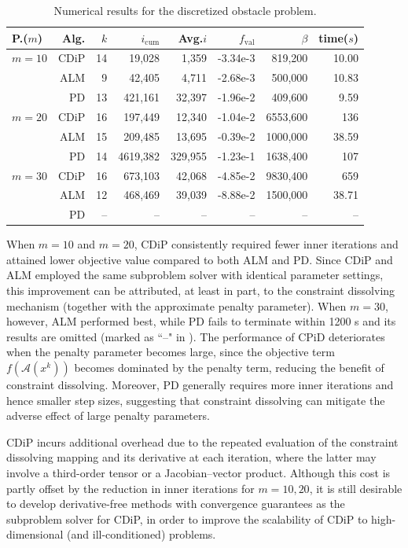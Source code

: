 \documentclass[11pt,a4paper,reqno]{amsart}
\begin{document}
{\begin{table}[htbp]
\centering
\renewcommand{\arraystretch}{1.2}
\begin{tabular}{l@{\hskip 10pt}rrrrrrr}
\hline
P.($m$) & Alg. & $k$ & $i_{\text{cum}}$ & Avg.$i$ & $f_{\text{val}}$ & $\beta$ & time($s$) \\
\hline
$m=10$ & CDiP & 14 & 19,028 & 1,359 & -3.34e-3 & 819,200 & 10.00 \\
 & ALM & 9 & 42,405 & 4,711 & -2.68e-3 & 500,000 & 10.83 \\
 & PD  & 13 & 421,161 & 32,397 & -1.96e-2 & 409,600 & 9.59 \\[4pt]
$m=20$ & CDiP & 16 & 197,449 & 12,340 & -1.04e-2 & 6553,600 & 136 \\
& ALM & 15 & 209,485 & 13,695 & -0.39e-2 & 1000,000 & 38.59\\
& PD & 14 & 4619,382 & 329,955 & -1.23e-1 & 1638,400 & 107 \\[4pt]
$m=30$  & CDiP & 16 & 673,103 & 42,068 & -4.85e-2 & 9830,400 & 659 \\
& ALM & 12 & 468,469 & 39,039& -8.88e-2 & 1500,000 & 38.71 \\
& PD & -- & -- & --& --& --& --\\
\hline
\end{tabular}
\caption{Numerical results for the discretized obstacle problem.} \label{Tabl:Obstacle}
\end{table}

When $m=10$ and $m=20$, CDiP consistently required fewer inner iterations and attained lower objective value compared to both ALM and PD. Since CDiP and ALM employed the same subproblem solver with identical parameter settings, this improvement can be attributed, at least in part, to the constraint dissolving mechanism (together with the approximate penalty parameter). When $m=30$, however, ALM performed best, while PD fails to terminate within 1200 s and its results are omitted (marked as ``--" in ). The performance of CPiD deteriorates when the penalty parameter becomes large, since the objective term $f(\mathcal A(x^k))$ becomes dominated by the penalty term, reducing the benefit of constraint dissolving. Moreover, PD generally requires more inner iterations and hence smaller step sizes, suggesting that constraint dissolving can mitigate the adverse effect of large penalty parameters.

CDiP incurs additional overhead due to the repeated evaluation of the constraint dissolving mapping and its derivative at each iteration, where the latter may involve a third-order tensor or a Jacobian--vector product. Although this cost is partly offset by the reduction in inner iterations for $m=10,20$, it is still desirable to develop derivative-free methods with convergence guarantees as the subproblem solver for CDiP, in order to improve the scalability of CDiP to high-dimensional (and ill-conditioned) problems.


}
\end{document}
